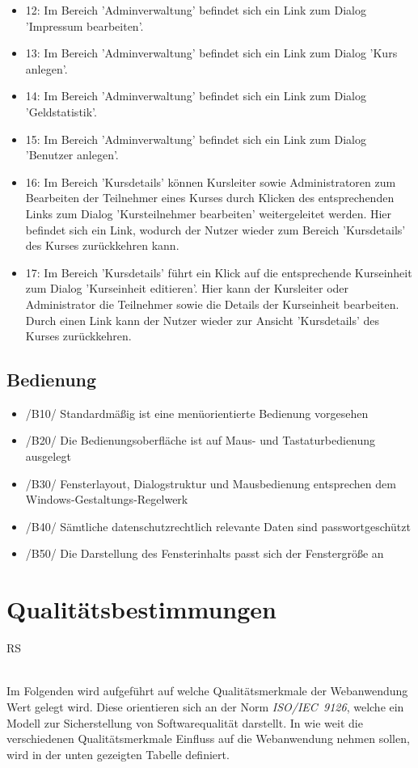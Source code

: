 \documentclass[a4paper]{scrreprt}
\begin{document}
\begin{itemize}
\begin{itemize}
	    \item 12: Im Bereich 'Adminverwaltung' befindet sich ein Link zum Dialog 'Impressum bearbeiten'.
	    \item 13: Im Bereich 'Adminverwaltung' befindet sich ein Link zum Dialog 'Kurs anlegen'.
	    \item 14: Im Bereich 'Adminverwaltung' befindet sich ein Link zum Dialog 'Geldstatistik'.
	    \item 15: Im Bereich 'Adminverwaltung' befindet sich ein Link zum Dialog 'Benutzer anlegen'.
	    \item 16: Im Bereich 'Kursdetails' können Kursleiter sowie Administratoren zum Bearbeiten der Teilnehmer eines Kurses durch Klicken des entsprechenden Links zum Dialog 'Kursteilnehmer bearbeiten' weitergeleitet werden. Hier befindet sich ein Link, wodurch der Nutzer wieder zum Bereich 'Kursdetails' des Kurses zurückkehren kann.
	    \item 17: Im Bereich 'Kursdetails' führt ein Klick auf die entsprechende Kurseinheit zum Dialog 'Kurseinheit editieren'. Hier kann der Kursleiter oder Administrator die Teilnehmer sowie die Details der Kurseinheit bearbeiten. Durch einen Link kann der Nutzer wieder zur Ansicht 'Kursdetails' des Kurses zurückkehren.
	    \end{itemize}
	    
	    \end{itemize}
        
    \section{Bedienung}       
	    \begin{itemize}
			\item /B10/ Standardmäßig ist eine menüorientierte Bedienung vorgesehen
			\item /B20/ Die Bedienungsoberfläche ist auf Maus- und Tastaturbedienung ausgelegt
			\item /B30/ Fensterlayout, Dialogstruktur und Mausbedienung entsprechen dem Windows-Gestaltungs-Regelwerk
			\item /B40/ Sämtliche datenschutzrechtlich relevante Daten sind passwortgeschützt
			\item /B50/ Die Darstellung des Fensterinhalts passt sich der Fenstergröße an
		\end{itemize}
            
            
         
\chapter{Qualitätsbestimmungen}
	\begin{tiny}
		RS
	\end{tiny}\\
	Im Folgenden wird aufgeführt auf welche Qualitätsmerkmale der Webanwendung Wert gelegt wird. Diese orientieren sich an der Norm \textit{ISO/IEC~9126}, welche ein Modell zur Sicherstellung von Softwarequalität darstellt. In wie weit die verschiedenen Qualitätsmerkmale Einfluss auf die Webanwendung nehmen sollen, wird in der unten gezeigten Tabelle definiert.\\
\end{document}
